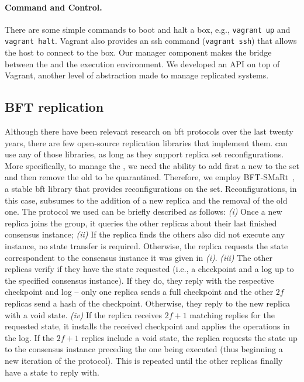\paragraph{Command and Control.}
There are some simple commands to boot and halt a box, e.g., \texttt{vagrant up} and \texttt{vagrant halt}. 
Vagrant also provides an ssh command (\texttt{vagrant ssh}) that allows the host to connect to the box. 
Our manager component makes the bridge between the \risk and the execution environment.
We developed an API on top of Vagrant, another level of abstraction made to manage replicated systems.

\subsection{BFT replication}
Although there have been relevant research on \gls{bft} protocols over the last twenty years, there are few open-source replication libraries that implement them. \system can use any of those libraries, as long as they support replica set reconfigurations.
More specifically, to manage the \replicas, we need the ability to add first a new \replica to the set and then remove the old \replica to be quarantined. 
Therefore, we employ BFT-SMaRt~\cite{Bessani:2014}, a stable \gls{bft} library that provides reconfigurations on the \replicas set.
Reconfigurations, in this case, subsumes to the addition of a new replica and the removal of the old one.
The protocol we used can be briefly described as follows:
\emph{(i)} Once a new replica joins the group, it queries the other replicas about their last finished consensus instance;
\emph{(ii)} If the replica finds the others also did not execute any instance, no state transfer is required. Otherwise, the replica requests the state correspondent to the consensus instance it was given in \emph{(i)}.
\emph{(iii)} The other replicas verify if they have the state requested (i.e., a checkpoint and a log up to the specified consensus instance). 
If they do, they reply with the respective checkpoint and log -- only one replica sends a full checkpoint and the other $2f$ replicas send a hash of the checkpoint. 
Otherwise, they reply to the new replica with a void state.
\emph{(iv)} If the replica receives $2f+1$ matching replies for the requested state, it installs the received checkpoint and applies the operations in the log. 
If the $2f+1$ replies include a void state, the replica requests the state up to the consensus instance preceding the one being executed (thus beginning a new iteration of the protocol). 
This is repeated until the other replicas finally have a state to reply with. 


